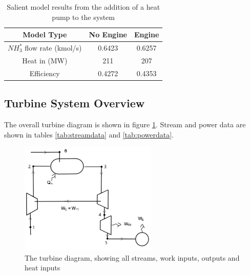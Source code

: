 \begin {table} [h]
\begin{center}
\caption{Salient model results from the addition of a heat pump to the system} \label{tab:heatengine} 
\begin{tabular}{ |c|c|c| }
 \hline
  Model Type & No Engine & Engine\\ 
  \hline
  $NH_3^*$ flow rate (kmol/s) & 0.6423 & 0.6257\\ 
 \hline
  Heat in (MW) & 211& 207\\
  \hline
  Efficiency & 0.4272 & 0.4353\\
 \hline
\end{tabular}
\end{center}  
\end {table}

\pagebreak
\subsection{Turbine System Overview}
The overall turbine diagram is shown in figure \ref{fig:turbinediagram}. Stream and power data are shown in tables \ref{tab:streamdata} and \ref{tab:powerdata}.

\begin{figure} [h]
\centering
\includegraphics[width=0.58\textwidth]{./pictures/plantdiagram.png}
  \caption{The turbine diagram, showing all streams, work inputs, outputs and heat inputs} \label{fig:turbinediagram}
  \end{figure}
  
